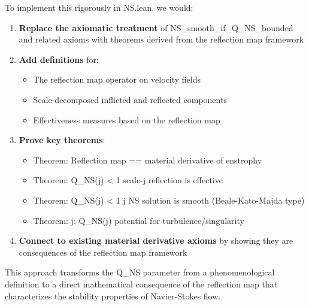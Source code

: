 \documentclass[11pt]{article}
\begin{document}
To implement this rigorously in NS.lean, we would:

\begin{enumerate}
\item \textbf{Replace the axiomatic treatment} of NS_smooth_if_Q_NS_bounded and related axioms with theorems derived from the reflection map framework

\item \textbf{Add definitions} for:
  \begin{itemize}
  \item The reflection map operator on velocity fields
  \item Scale-decomposed inflicted and reflected components
  \item Effectiveness measures based on the reflection map
  \end{itemize}

\item \textbf{Prove key theorems}:
  \begin{itemize}
  \item Theorem: Reflection map == material derivative of enstrophy
  \item Theorem: Q_{NS}(j) < 1 \Leftrightarrow scale-j reflection is effective
  \item Theorem: Q_{NS}(j) < 1 \forall j \Leftrightarrow NS solution is smooth (Beale-Kato-Majda type)
  \item Theorem: \exists j: Q_{NS}(j)  \Leftrightarrow potential for turbulence/singularity
  \end{itemize}

\item \textbf{Connect to existing material derivative axioms} by showing they are consequences of the reflection map framework
\end{enumerate}

This approach transforms the Q_{NS} parameter from a phenomenological definition to a direct mathematical consequence of the reflection map that characterizes the stability properties of Navier-Stokes flow.
\end{document}
